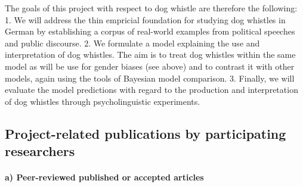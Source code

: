 \documentclass[11pt]{article}
\newcommand{\dfgcomments}[1]{\textcolor{green}{#1}}
\renewcommand{\dfgcomments}[1]{}
\begin{document}
The goals of this project with respect to dog whistle are therefore the following: 1. We will address the thin empricial foundation for studying dog whistles in German by establishing a corpus of real-world examples from political speeches and public discourse.  2. We formulate a model explaining the use and interpretation of dog whistles.  The aim is to treat dog whistles within the same model as will be use for gender biases (see above) and to contrast it with other models, again using the tools of Bayesian model comparison.  3. Finally, we will evaluate the model predictions with regard to the production and interpretation of dog whistles through psycholinguistic experiments.  

\subsection{Project-related publications by participating researchers}


\dfgcomments{\begin{enumerate}[a)]
  \item articles which at the time of draft proposal submission have been published or officially accepted  by  publication  outlets  with  scientific  quality  assurance,  and  book  publications;
  \item other publications;
  \item patents (subdivided into pending and issued).
  \end{enumerate}}

\dfgcomments{The total number of works listed under a) and b) combined may not exceed ten. When listing papers that have been officially accepted for publication but not yet published, the manuscript  and  the  publisher’s  dated  acknowledgement  of  acceptance  must  be  submitted  via  elan. The DFG will forward an electronic copy of the draft proposal -- and a print copy upon request -- to the consultation panel.}

\paragraph{a) Peer-reviewed published or accepted articles}
\end{document}
